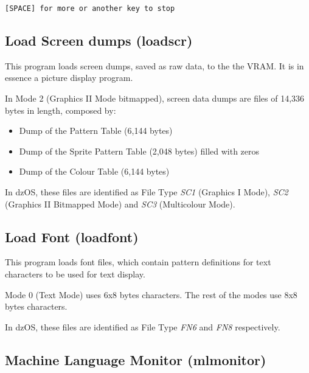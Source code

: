     \hspace{1cm}\texttt{[SPACE] for more or another key to stop}

    \subsection{Load Screen dumps (loadscr)}
    \label{sub:loadscr}
    This program loads screen dumps, saved as raw data, to the the VRAM. It is
    in essence a picture display program.

    In Mode 2 (Graphics II Mode bitmapped), screen data dumps are files of
    14,336 bytes in length, composed by:
    \begin{itemize}
        \item Dump of the Pattern Table (6,144 bytes)
        \item Dump of the Sprite Pattern Table (2,048 bytes) filled with zeros
        \item Dump of the Colour Table (6,144 bytes)
    \end{itemize}

    In dzOS, these files are identified as File Type \textit{SC1}
    (Graphics I Mode), \textit{SC2} (Graphics II Bitmapped Mode) and
    \textit{SC3} (Multicolour Mode).

    \subsection{Load Font (loadfont)}
    \label{sub:loadfont}

    This program loads font files, which contain pattern definitions for text
    characters to be used for text display.

    Mode 0 (Text Mode) uses 6x8 bytes characters. The rest of the modes use 8x8
    bytes characters.

    In dzOS, these files are identified as File Type \textit{FN6} and
    \textit{FN8} respectively.

    \subsection{Machine Language Monitor (mlmonitor)}
    \label{software:mlmonitor}

